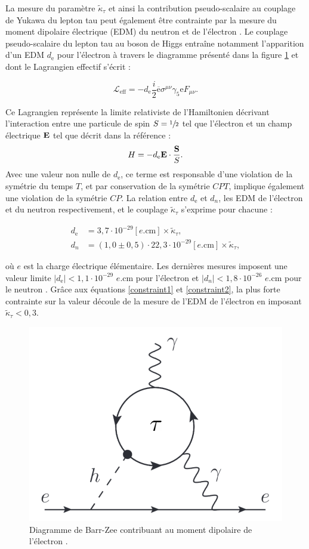 La mesure du paramètre $\tilde{\kappa}_{\tau}$ et ainsi la contribution pseudo-scalaire au couplage de Yukawa du lepton tau peut également être contrainte par la mesure du moment dipolaire électrique (EDM) du neutron et de l'électron \cite{Brod2013}. Le couplage pseudo-scalaire du lepton tau au boson de Higgs entraîne notamment l'apparition d'un EDM $d_\mathrm{e}$ pour l'électron à travers le diagramme présenté dans la figure \ref{barrzee} et dont le Lagrangien effectif s'écrit :

\begin{equation}
    \mathcal{L}_{\text{eff}}=-d_\mathrm{e}\frac{i}{2}\overline{\mathrm{e}}\sigma^{\mu\nu}\gamma_5\mathrm{e}F_{\mu\nu}.
\end{equation}

Ce Lagrangien représente la limite relativiste de l'Hamiltonien décrivant l'interaction entre une particule de spin $S=\sfrac{1}{2}$ tel que l'électron et un champ électrique $\vb{E}$ tel que décrit dans la référence \cite{Pospelov_2005} : $$H=-d_\mathrm{e}\vb{E}\cdot\frac{\vb{S}}{S}.$$ Avec une valeur non nulle de $d_\mathrm{e}$, ce terme est responsable d'une violation de la symétrie du temps $T$, et par conservation de la symétrie $CPT$, implique également une violation de la symétrie $CP$. La relation entre $d_\mathrm{e}$ et $d_n$, les EDM de l'électron et du neutron respectivement, et le couplage $\tilde{\kappa}_{\tau}$ s'exprime pour chacune :

\begin{align}
    d_\mathrm{e}&=3,7\cdot10^{-29}[e.\text{cm}]\times\tilde{\kappa}_{\tau},
    \label{constraint1} \\
    d_n&=(1,0\pm0,5)\cdot22,3\cdot10^{-29}[e.\text{cm}]\times\tilde{\kappa}_{\tau},
    \label{constraint2}
\end{align}

où $e$ est la charge électrique élémentaire. Les dernières mesures imposent une valeur limite $|d_\mathrm{e}|<1,1\cdot10^{-29}$ $e.\text{cm}$ pour l'électron \cite{eEDM} et $|d_n|<1,8\cdot10^{-26}$ $e.\text{cm}$ pour le neutron \cite{nEDM}. Grâce aux équations \ref{constraint1} et \ref{constraint2}, la plus forte contrainte sur la valeur découle de la mesure de l'EDM de l'électron en imposant $\tilde{\kappa}_{\tau}<0,3$.

\begin{figure}
\centering
    \includegraphics[scale=0.25]{Chapitre5/Images/barrzee.png} 
    \caption{Diagramme de Barr-Zee contribuant au moment dipolaire de l'électron \cite{barrzee}.}
    \label{barrzee}
\end{figure}
